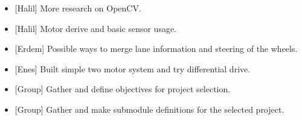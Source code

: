 \documentclass[a4paper,12pt]{article}
\begin{document}
\begin{itemize}
	
	\item {[Halil]} More research on OpenCV.
	\item {[Halil]} Motor derive and basic sensor usage.
	\item {[Erdem]}	Possible ways to merge lane information and steering of the wheels.
	\item {[Enes]} Built simple two motor system and try differential drive.
	\item {[Group]} Gather and define objectives for project selection.
	\item  {[Group]} Gather and make submodule definitions for the selected project.
	
	
\end{itemize}



	


\end{document}
